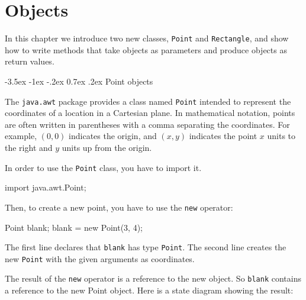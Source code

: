 \documentclass[12pt]{book}
\makeatletter
\theoremstyle{exercise}
\newcommand{\java}[1]{\verb"#1"}
\renewcommand{\section}{\@startsection{section}{1}{\z@}%
    {-3.5ex \@plus -1ex \@minus -.2ex}%
    {0.7ex \@plus.2ex}%
    {\normalfont\Large\bfseries}}
\newcommand{\java}[1]{\lstinline{#1}} %
\makeatother
\begin{document}
\chapter{Objects}
\label{objects}



In this chapter we introduce two new classes, \java{Point} and \java{Rectangle}, and show how to write methods that take objects as parameters and produce objects as return values.


\section{Point objects}
\label{point}

The \java{java.awt} package provides a class named \java{Point} intended to represent the coordinates of a location in a Cartesian plane.
In mathematical notation, points are often written in parentheses with a comma separating the coordinates.
For example, $(0,0)$ indicates the origin, and $(x,y)$ indicates the point $x$ units to the right and $y$ units up from the origin.


In order to use the \java{Point} class, you have to import it.

\begin{code}
import java.awt.Point;
\end{code}

Then, to create a new point, you have to use the \java{new} operator:

\begin{code}
    Point blank;
    blank = new Point(3, 4);
\end{code}


The first line declares that \java{blank} has type \java{Point}.
The second line creates the new \java{Point} with the given arguments as coordinates.


The result of the \java{new} operator is a reference to the new object.
So \java{blank} contains a reference to the new Point object.
Here is a state diagram showing the result:
\end{document}
